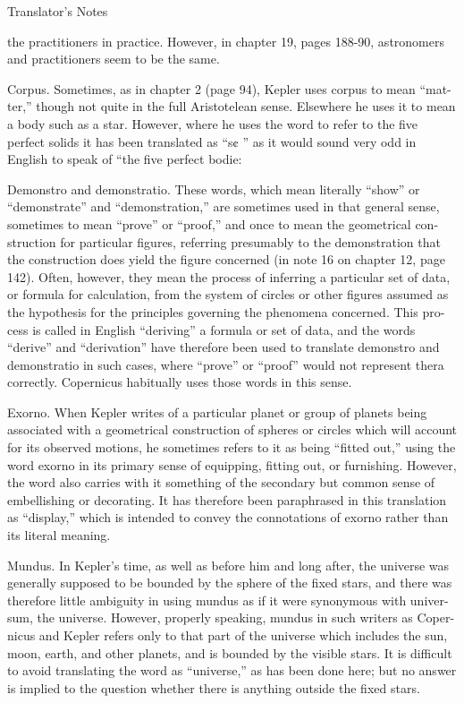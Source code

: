 \documentclass{article}
\begin{document}
Translator’s Notes

the practitioners in practice. However, in chapter 19, pages 188-90, astronomers
and practitioners seem to be the same.

Corpus. Sometimes, as in chapter 2 (page 94), Kepler uses corpus to mean “mat-
ter,” though not quite in the full Aristotelean sense. Elsewhere he uses it to mean
a body such as a star. However, where he uses the word to refer to the five perfect
solids it has been translated as “s¢ ” as it would sound very odd in English to
speak of “the five perfect bodie:

Demonstro and demonstratio. These words, which mean literally “show” or
“demonstrate” and “demonstration,” are sometimes used in that general sense,
sometimes to mean “prove” or “proof,” and once to mean the geometrical con-
struction for particular figures, referring presumably to the demonstration that
the construction does yield the figure concerned (in note 16 on chapter 12, page
142). Often, however, they mean the process of inferring a particular set of data,
or formula for calculation, from the system of circles or other figures assumed as
the hypothesis for the principles governing the phenomena concerned. This pro-
cess is called in English “deriving” a formula or set of data, and the words
“derive” and “derivation” have therefore been used to translate demonstro and
demonstratio in such cases, where “prove” or “proof” would not represent thera
correctly. Copernicus habitually uses those words in this sense.

Exorno. When Kepler writes of a particular planet or group of planets being
associated with a geometrical construction of spheres or circles which will account
for its observed motions, he sometimes refers to it as being “fitted out,” using the
word exorno in its primary sense of equipping, fitting out, or furnishing.
However, the word also carries with it something of the secondary but common
sense of embellishing or decorating. It has therefore been paraphrased in this
translation as “display,” which is intended to convey the connotations of exorno
rather than its literal meaning.

Mundus. In Kepler’s time, as well as before him and long after, the universe was
generally supposed to be bounded by the sphere of the fixed stars, and there was
therefore little ambiguity in using mundus as if it were synonymous with univer-
sum, the universe. However, properly speaking, mundus in such writers as Coper-
nicus and Kepler refers only to that part of the universe which includes the sun,
moon, earth, and other planets, and is bounded by the visible stars. It is difficult
to avoid translating the word as “universe,” as has been done here; but no answer
is implied to the question whether there is anything outside the fixed stars.
\end{document}
